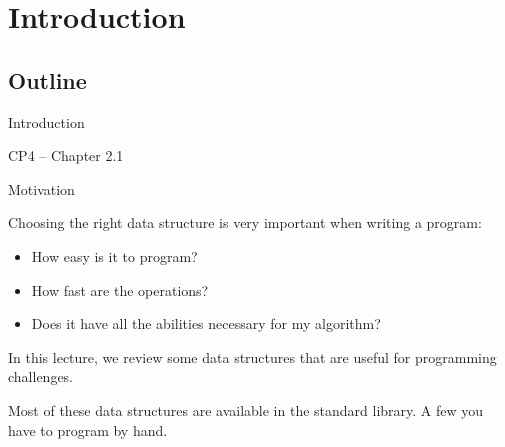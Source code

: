\section{Introduction}
\subsection{Outline}

\begin{frame}
  \begin{center}
    {\large
    Introduction\bigskip

    CP4 -- Chapter 2.1}
  \end{center}
\end{frame}

\begin{frame}{Motivation}

  Choosing the right data structure is very important when writing a program:\medskip

  \begin{itemize}
    \item How easy is it to program?
    \item How fast are the operations?
    \item Does it have all the abilities necessary for my algorithm?
  \end{itemize}\bigskip

  In this lecture, we review some data structures that are useful for programming challenges.\medskip

  Most of these data structures are available in the standard library. A few you have to
  program by hand.
\end{frame}

